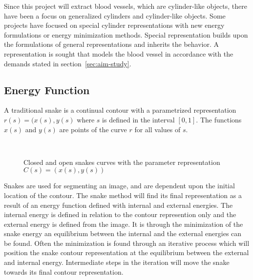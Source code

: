Since this project will extract blood vessels, which are cylinder-like
objects, there have been a focus on generalized cylinders and
cylinder-like objects. Some projects have focused on special cylinder
representations with new energy formulations or energy minimization
methods.  Special representation builds upon the formulations of
general representations and inherits the behavior. A representation is
sought that models the blood vessel in accordance with the demands
stated in section~\ref{sec:aim-study}.

\subsection{Energy Function}
\label{sec:energy-function}

A traditional snake is a continual contour with a parametrized
representation $r(s) = (x(s),y(s)$ where $s$ is defined in the
interval $[0,1]$. The functions $x(s)$ and $y(s)$ are points of the
curve $r$ for all values of $s$.
\begin{figure}[htbp]
  \centering
  \mbox{%
    \quad
    }
  \caption{Closed and open snakes curves with the parameter
    representation $C(s)=(x(s),y(s))$}
  \label{fig:snake-traditional-open.eps}
\end{figure}
Snakes are used for segmenting an image, and are dependent upon the
initial location of the contour. The snake method will find its
final representation as a result of an energy function defined with
internal and external energies. The internal energy is defined in
relation to the contour represention only and the external energy is
defined from the image. It is through the minimization of the snake
energy an equilibrium between the internal and the external energies
can be found. Often the minimization is found through an iterative
process which will position the snake contour representation at the
equilibrium between the external and internal energy. Intermediate
steps in the iteration will move the snake towards its final contour
representation.

